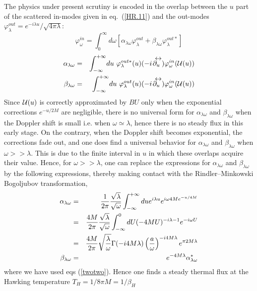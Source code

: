 \documentclass[12pt,oneside]{report}
\def\om{\omega	}
\def\la{\lambda}
\def\lr #1{\mathrel{#1\kern-.75em\raise1.75ex\hbox{$\leftrightarrow$}}}
\begin{document}
The physics under present scrutiny is encoded in the overlap between
the $u$ part of the scattered in-modes 
given in eq.~(\ref{HR.11})
 and the out-modes $\varphi_\lambda ^{out}=e^{-i\lambda u}/
\sqrt{4 \pi \lambda}$:
\begin{equation}
\varphi_\omega^{in} = \int_0^\infty \! d \omega \left[
\alpha_{\la \om} \varphi_\lambda ^{out} + \beta_{\la \om}
\varphi_\lambda ^{out *}
\right]
\label{twotwobh}
\end{equation}
\begin{eqnarray}
\alpha_{\la \om} &=& \int^{+ \infty}_{-\infty} 
\! du\ \varphi_{\la}^{out *}(u) (-i\! \lr{ \partial_u})
\varphi_\omega^{in} ({{\cal{U}}(u)})
\nonumber\\
 \beta_{\la \om} &=& \int^{+ \infty}_{-\infty}
 \! du\ \varphi_{\la}^{out} (u) 
(-i\! \lr{ \partial_u})\varphi_\omega^{in} ({{\cal{U}}(u)})
\label{alphabh}
\end{eqnarray}
Since ${{\cal{U}}(u)}$ is correctly approximated by $BU$ only when the 
exponential corrections $e^{-u/2M}$ are negligible, there is no universal
form for $\alpha_{\la \om}$ and $\beta_{\la \om}$ when the Doppler shift is
small i.e. when $\om \simeq \la$, hence there is no steady flux in this
early stage. On the contrary, when the Doppler shift becomes  exponential,
the corrections fade out, and one does find a universal behavior
for $\alpha_{\la \om}$ and $\beta_{\la \om}$ when $\om >> \la$. This is due to the 
finite interval in $u$ in which these overlaps acquire their value.
Hence, for $\om >> \la$, one can replace the expressions for 
$\alpha_{\la \om}$ and $\beta_{\la \om}$ by the following expressions,
thereby making contact with the Rindler--Minkowski Bogoljubov transformation, 
\begin{eqnarray}
\alpha_{\la \om} &=& {1 \over 2\pi} { \sqrt{ \lambda} \over \sqrt{\omega}}
\int^{+ \infty}_{-\infty}
 du e^{i \lambda u} e^{i \omega 4M e^{-u/4M}} \nonumber\\
 &=& { 4M \over 2\pi} { \sqrt{ \lambda} \over \sqrt{\omega}} \int^0_{-\infty}
dU (-4MU)^{-i \lambda -1} e^{-i \omega U} \nonumber\\
 &=& {4M \over 2 \pi } \sqrt{\la \over \om}
\Gamma(-i4M \la)
\left( {a \over \om} \right)^{-i4M \la}
e^{\pi 2M \la }\nonumber\\ 
\beta_{\la \om} &=& 
 e^{- 4M\la} \alpha_{\la \om}^*
\label{alphabh2}
\end{eqnarray}
where we have used eqs (\ref{twotwo}).
Hence one finds 
a
steady thermal flux at the Hawking temperature $T_H= 1/ 8\pi M = 1/\beta_H$
\end{document}
